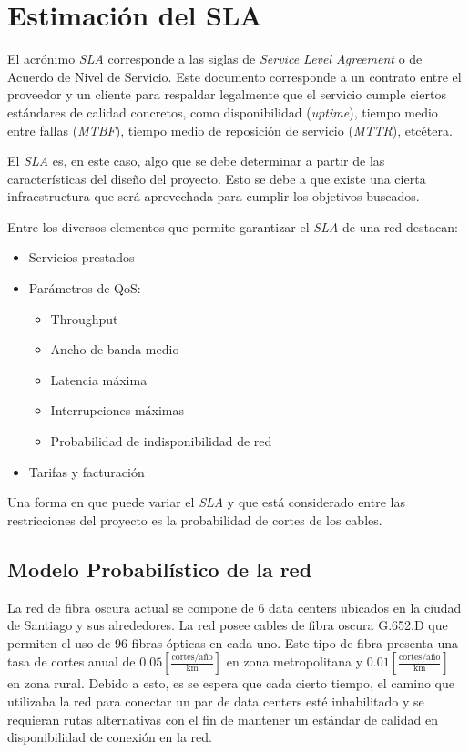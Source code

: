 \section{Estimación del SLA}
\label{sec:SLA}

El acrónimo \emph{SLA} corresponde a las siglas de \emph{Service Level
Agreement} o de Acuerdo de Nivel de Servicio. Este documento corresponde 
a un contrato entre el proveedor y un cliente para respaldar legalmente 
que el servicio cumple ciertos estándares de calidad concretos, como 
disponibilidad (\emph{uptime}), tiempo medio entre fallas (\emph{MTBF}),
tiempo medio de reposición de servicio (\emph{MTTR}), etcétera.

El \emph{SLA} es, en este caso, algo que se debe determinar a partir de 
las características del diseño del proyecto. Esto se debe a que existe 
una cierta infraestructura que será aprovechada para cumplir los 
objetivos buscados.

Entre los diversos elementos que permite garantizar el \emph{SLA} de
una red destacan:
\begin{itemize}
\item Servicios prestados
\item Parámetros de QoS:
  \begin{itemize}
  \item Throughput
  \item Ancho de banda medio
  \item Latencia máxima
  \item Interrupciones máximas
  \item Probabilidad de indisponibilidad de red
  \end{itemize}
\item Tarifas y facturación
\end{itemize}

Una forma en que puede variar el \emph{SLA} y que está considerado
entre las restricciones del proyecto es la probabilidad de cortes de
los cables.

\subsection{Modelo Probabilístico de la red}

La red de fibra oscura actual se compone de 6 data centers ubicados 
en la ciudad de Santiago y sus alrededores. La red posee cables de 
fibra oscura G.652.D que permiten el uso de 96 fibras ópticas en cada 
uno. Este tipo de fibra presenta una tasa de cortes anual de $0.05 
[\frac{\text{cortes}/\text{año}}{\text{km}}]$ en zona metropolitana y 
$0.01 [\frac{\text{cortes}/\text{año}}{\text{km}}]$ en zona rural. 
Debido a esto, es se espera que cada cierto tiempo, el camino que 
utilizaba la red para conectar un par de data centers esté 
inhabilitado y se requieran rutas alternativas con el fin de mantener 
un estándar de calidad en disponibilidad de conexión en la red.

